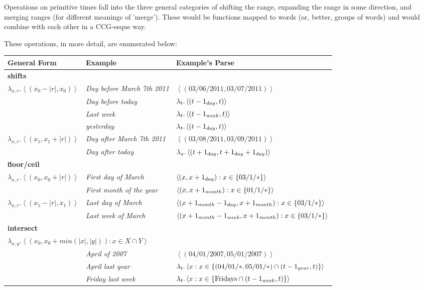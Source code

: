 \documentclass{article}
\begin{document}
Operations on primitive times fall into the three general categories
	of shifting the range, expanding the range in some direction,
	and merging ranges (for different meanings of 'merge').
These would be functions mapped to words (or, better, groups of words)
	and would combine with each other in a CCG-esque way.

These operations, in more detail, are enumerated below:

\begin{center}
\begin{tabular}{l l l}
	{\bf General Form} & {\bf Example} & {\bf Example's Parse} \\
	\hline

	\multicolumn{3}{l}{{\bf shifts}} \\
	$\lambda_{x,r}.\left< (x_0-|r|, x_0) \right>$
		& {\em Day before March 7th 2011} 
			& $\left< (03/06/2011,03/07/2011) \right>$\\
		& {\em Day before today} 
			& $\lambda_{t}.\left< (t-1_{day},t) \right>$\\
		& {\em Last week} 
			& $\lambda_t.\left< (t-1_{week},t) \right>$ \\
		& {\em yesterday} 
			& $\lambda_t.\left< (t-1_{day},t) \right>$ \\
	$\lambda_{x,r}.\left< (x_1, x_1+|r|) \right>$
		& {\em Day after March 7th 2011} 
			& $\left< (03/08/2011,03/09/2011) \right>$\\
		& {\em Day after today} 
			& $\lambda_{x}.\left< (t+1_{day},t+1_{day}+1_{day}) \right>$\\
	
	\multicolumn{3}{l}{{\bf floor/ceil}} \\
	$\lambda_{x,r}.\left< (x_0, x_0+|r|) \right>$
		& {\em First day of March} 
			& $\left< (x,x+1_{day}) : x \in \{ 03/1/* \} \right>$ \\
		& {\em First month of the year} 
			& $\left< (x,x+1_{month}) : x \in \{ 01/1/* \} \right>$ \\
	$\lambda_{x,r}.\left< (x_1-|r|, x_1) \right>$
		& {\em Last day of March} 
			& $\left< (x+1_{month}-1_{day},x+1_{month}) 
				: x \in \{ 03/1/* \} \right>$ \\
		& {\em Last week of March} 
			& $\left< (x+1_{month}-1_{week},x+1_{month}) 
				: x \in \{ 03/1/* \} \right>$ \\
	
	\multicolumn{3}{l}{{\bf intersect}} \\
	\multicolumn{3}{l}{
			$\lambda_{x,y}.\left< (x_0, x_0+min(|x|,|y|)) : x \in X \cap Y \right>$}\\
		& {\em April of 2007} 
			& $\left< (04/01/2007,05/01/2007) \right>$ \\
		& {\em April last year} 
			& $\lambda_t.\left< x 
			  : x \in \{ (04/01/*,05/01/*) \cap (t-1_{year},t) \} \right>$ \\
		& {\em Friday last week} 
			& $\lambda_t.\left< x 
			  : x \in \{ \text{Fridays} \cap (t-1_{week},t) \} \right>$ \\
	

\end{tabular}
\end{center}
\end{document}
